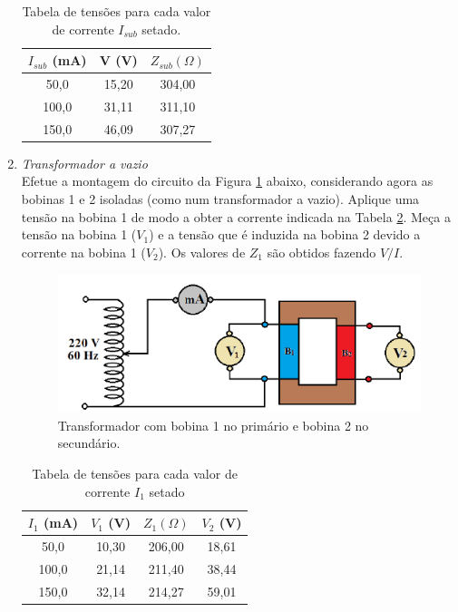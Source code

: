 \documentclass[a4paper,12pt,oneside,openany,table,xcdraw]{article}
\begin{document}
\begin{enumerate}[1)]
\begin{table}[h]
\centering
\def\arraystretch{1.35}
\captionsetup{type=table, font=scriptsize}
\caption{Tabela de tensões para cada valor de corrente $I_{sub}$ setado.} \label{tab2}
\begin{tabular}{|c|c|c|} 
\hline
$I_{sub}$ (mA) & V (V) & $Z_{sub} (\Omega)$ \\ \hline
50,0          & 15,20 &  304,00           \\ \hline
100,0        & 31,11 & 311,10            \\ \hline
150,0        &46,09  & 307,27            \\ \hline
\end{tabular}
\end{table}


\item \emph{Transformador a vazio}\\
Efetue a montagem do circuito da Figura \ref{2.5} abaixo, considerando agora as bobinas 1 e 2
isoladas (como num transformador a vazio). Aplique uma tensão na bobina 1 de modo a
obter a corrente indicada na Tabela \ref{tab3}. Meça a tensão na bobina 1 ($V_1$) e a tensão que é
induzida na bobina 2 devido a corrente na bobina 1 ($V_2$). Os valores de $Z_1$ são obtidos fazendo $V/I$.

\begin{figure}[h]
\centering
\captionsetup{font=scriptsize}
\includegraphics[width=11cm]{fig4}
\caption{Transformador com bobina 1 no primário e bobina 2 no secundário.}
\label{2.5}
\end{figure}

\begin{table}[h]
\centering
\def\arraystretch{1.35}
\captionsetup{type=table, font=scriptsize}
\caption{Tabela de tensões para cada valor de corrente $I_1$ setado} \label{tab3}
\begin{tabular}{|c|c|c|c|}
\hline
$I_1$ (mA) & $V_1$ (V)  & $Z_{1} (\Omega)$ & $V_2$ (V) \\ \hline
50,0          & 10,30  &  206,00       &  18,61     \\ \hline
100,0        & 21,14  &  211,40       &  38,44   \\ \hline
150,0        & 32,14  &  214,27       &  59,01   \\ \hline
\end{tabular}
\end{table}


\end{enumerate}
\end{document}
